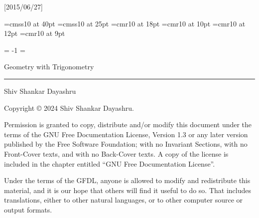 

\beginpackages
  \usepackage{url}[2015/06/27]
  \usepackage[dvipsnames]{color}
\endpackages
\enablehyperlinks
{}

\font\titlefont=cmss10 at 40pt
\font\subtitlefont=cmss10 at 25pt
\font\authorfont=cmr10 at 18pt
\font\chaptitlefont=cmr10 at 10pt
\font\partfont=cmr10 at 12pt
\font\sectionfont=cmr10 at 9pt

\pdfpagewidth=210mm
\pdfpageheight=297mm
\paperwidth=210mm
\paperheight=297mm


\pageno = -1
\begingroup
  \nopagenumbers
  \headline={\kern-2in}
  ~~~
  \vskip 2cm
  \titlefont\centerline{\color{white}Geometry with
Trigonometry}
  \vskip 2mm
  {\color{white}\hrule}
  \vskip 2mm
  \subtitlefont{}
  \vskip 1.5cm
  \vfill
  \authorfont\color{white}Shiv Shankar Dayashru
  \color{black}
  \vfil
  \eject
\endgroup
\color{black}
\rewritetocfiletrue %
\completebooktrue
\edgetabsfalse
%
\noheadlinetrue
\sinkage

\bigskip

\bigskip

\vskip 2in
\noindent Copyright \copyright{} 2024 Shiv Shankar Dayashru.

\bigskip
\noindent Permission is granted to copy, distribute and/or modify this
document under the terms of the GNU Free Documentation License, Version
1.3 or any later version published by the Free Software Foundation; with
no Invariant Sections, with no Front-Cover texts, and with no Back-Cover
texts.  A copy of the license is included in the chapter entitled ``GNU
Free Documentation License''.

\medskip\noindent
Under the terms of the GFDL, anyone is allowed to modify and
redistribute this material, and it is our hope that others will find it
useful to do so.  That includes translations, either to other natural
languages, or to other computer source or output formats.

